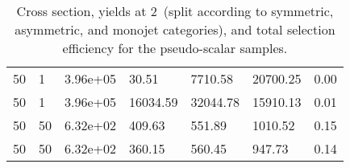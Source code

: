 \begin{table}
\begin{tabular}{lllllll}
50        &   1         &   3.96e+05  &   30.51     &   7710.58   &   20700.25  &   0.00      \\ 
50        &   1         &   3.96e+05  &   16034.59  &   32044.78  &   15910.13  &   0.01      \\ 
50        &   50        &   6.32e+02  &   409.63    &   551.89    &   1010.52   &   0.15      \\ 
50        &   50        &   6.32e+02  &   360.15    &   560.45    &   947.73    &   0.14      \\ 
\hline
\end{tabular}
\caption{Cross section, yields at 2~\ifb (split according to symmetric, asymmetric, and monojet categories), and total selection efficiency for the pseudo-scalar \DMtt samples.}
\label{tab:dm_DMttP_g1_2fb}
\end{table}
